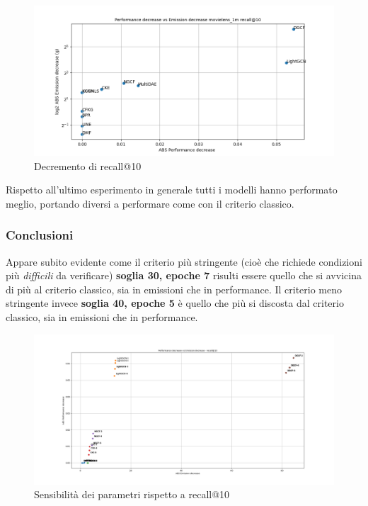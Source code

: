 \begin{figure}[H]
    \centering
     \includegraphics[width=\textwidth]{images/decrement_recall@10_movielens_1m_30_7.png}
    \caption{Decremento di recall@10}
\end{figure}

\noindent Rispetto all'ultimo esperimento in generale tutti i modelli hanno performato meglio, portando diversi a performare come con il criterio classico.



\subsubsection{Conclusioni}

Appare subito evidente come il criterio più stringente (cioè che richiede condizioni più \textit{difficili} da verificare) \textbf{soglia 30, epoche 7} risulti essere quello che si avvicina di più al criterio classico, sia in emissioni che in performance. Il criterio meno stringente invece \textbf{soglia 40, epoche 5} è quello che più si discosta dal criterio classico, sia in emissioni che in performance.\\


\begin{figure}[H]
    \includegraphics[width=\textwidth]{images/sensibility_recall@10.png}
    \caption{Sensibilità dei parametri rispetto a recall@10}
\end{figure}

